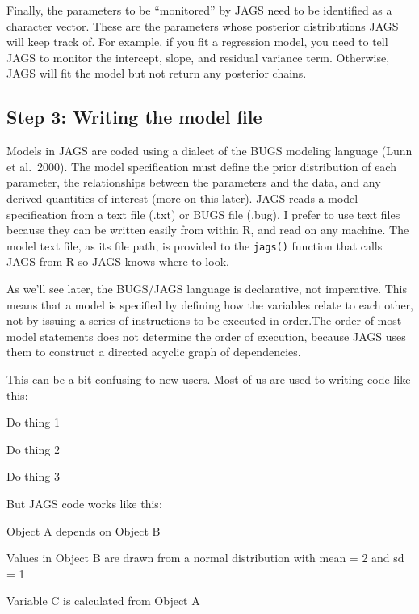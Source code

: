 \documentclass[
  13,
  letterpaper,
]{report}
\newenvironment{Shaded}{\begin{snugshade}}{\end{snugshade}}
\newcommand{\NormalTok}[1]{\textcolor[rgb]{0.00,0.23,0.31}{#1}}
\begin{document}
Finally, the parameters to be ``monitored'' by JAGS need to be
identified as a character vector. These are the parameters whose
posterior distributions JAGS will keep track of. For example, if you fit
a regression model, you need to tell JAGS to monitor the intercept,
slope, and residual variance term. Otherwise, JAGS will fit the model
but not return any posterior chains.

\subsection{Step 3: Writing the model
file}\label{step-3-writing-the-model-file}

Models in JAGS are coded using a dialect of the BUGS modeling language
(Lunn et al.~2000). The model specification must define the prior
distribution of each parameter, the relationships between the parameters
and the data, and any derived quantities of interest (more on this
later). JAGS reads a model specification from a text file (.txt) or BUGS
file (.bug). I prefer to use text files because they can be written
easily from within R, and read on any machine. The model text file, as
its file path, is provided to the \texttt{jags()} function that calls
JAGS from R so JAGS knows where to look.

As we'll see later, the BUGS/JAGS language is declarative, not
imperative. This means that a model is specified by defining how the
variables relate to each other, not by issuing a series of instructions
to be executed in order.The order of most model statements does not
determine the order of execution, because JAGS uses them to construct a
directed acyclic graph of dependencies.

This can be a bit confusing to new users. Most of us are used to writing
code like this:

\begin{Shaded}
\begin{Highlighting}[]
\NormalTok{Do thing 1}

\NormalTok{Do thing 2}

\NormalTok{Do thing 3}
\end{Highlighting}
\end{Shaded}

But JAGS code works like this:

\begin{Shaded}
\begin{Highlighting}[]
\NormalTok{Object A depends on Object B}

\NormalTok{Values in Object B are drawn from a normal distribution with mean = 2 and sd = 1}

\NormalTok{Variable C is calculated from Object A}
\end{Highlighting}
\end{Shaded}
\end{document}
